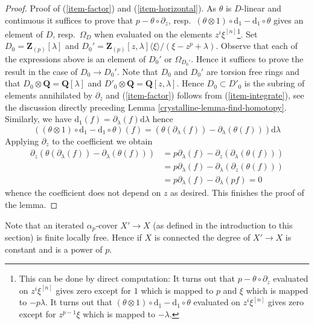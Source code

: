 \begin{proof}
\medskip\noindent
Proof of (\ref{item-factor}) and (\ref{item-horizontal}).
As $\theta$ is $D$-linear and continuous it suffices to prove that
$p - \theta \circ \partial_z$,
resp.\ $(\theta \otimes 1) \circ \text{d}_1 - \text{d}_1 \circ \theta$
gives an element of $D$, resp.\ $\Omega_D$ when evaluated on the
elements $z^i\xi^{[n]}$\footnote{This can be done by direct computation:
It turns out that $p - \theta \circ \partial_z$ evaluated on
$z^i\xi^{[n]}$ gives zero except for $1$ which is mapped to $p$ and
$\xi$ which is mapped to $-p\lambda$. It turns out that
$(\theta \otimes 1) \circ \text{d}_1 - \text{d}_1 \circ \theta$
evaluated on $z^i\xi^{[n]}$ gives zero except for $z^{p - 1}\xi$
which is mapped to $-\lambda$.}.
Set $D_0 = \mathbf{Z}_{(p)}[\lambda]$ and
$D_0' = \mathbf{Z}_{(p)}[z, \lambda]\langle \xi \rangle/(\xi - z^p + \lambda)$.
Observe that each of the expressions above is an element of
$D_0'$ or $\Omega_{D_0'}$. Hence it suffices to prove the result
in the case of $D_0 \to D_0'$. Note that $D_0$ and $D_0'$
are torsion free rings and that $D_0 \otimes \mathbf{Q} = \mathbf{Q}[\lambda]$
and $D'_0 \otimes \mathbf{Q} = \mathbf{Q}[z, \lambda]$.
Hence $D_0 \subset D'_0$ is the subring of elements annihilated
by $\partial_z$ and (\ref{item-factor})
follows from (\ref{item-integrate}), see the discussion directly preceding
Lemma \ref{crystalline-lemma-find-homotopy}. Similarly, we have
$\text{d}_1(f) = \partial_\lambda(f)\text{d}\lambda$ hence
$$
\left((\theta \otimes 1) \circ \text{d}_1 - \text{d}_1 \circ \theta\right)(f)
=
\left(\theta(\partial_\lambda(f)) - \partial_\lambda(\theta(f))\right)
\text{d}\lambda
$$
Applying $\partial_z$ to the coefficient we obtain
\begin{align*}
\partial_z\left(
\theta(\partial_\lambda(f)) - \partial_\lambda(\theta(f))
\right)
& =
p \partial_\lambda(f) - \partial_z(\partial_\lambda(\theta(f))) \\
& =
p \partial_\lambda(f) - \partial_\lambda(\partial_z(\theta(f))) \\
& =
p \partial_\lambda(f) - \partial_\lambda(p f) = 0
\end{align*}
whence the coefficient does not depend on $z$ as desired.
This finishes the proof of the lemma.
\end{proof}

Note that an iterated $\alpha_p$-cover $X' \to X$ (as defined in the
introduction to this section) is finite locally free. Hence if $X$ is
connected the degree of $X' \to X$ is constant and is a power of $p$.

